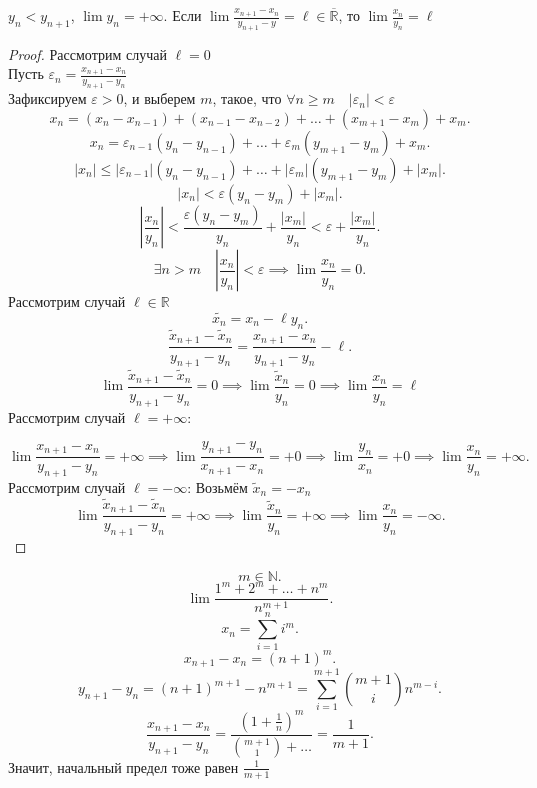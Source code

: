 \documentclass[11pt, oneside]{article}   	%
\begin{document}
    \begin{theorem}
        $y_n < y_{n+1}$, $\lim y_n = +\infty$. Если $\lim \frac{x_{n+1}-x_n}{y_{n+1}-y} = \ell\in \overline{\mathbb{R}}$, то $\lim \frac{x_n}{y_n} = \ell$ 
        \begin{proof}
            Рассмотрим случай $\ell = 0$\\
            Пусть $\varepsilon_n = \frac{x_{n+1}-x_n}{y_{n+1}-y_n}$ \\
            Зафиксируем $\varepsilon > 0$, и выберем  $m$, такое, что  $\forall{n\ge m}\quad |\varepsilon_n| < \varepsilon$\\
            \[ x_n = (x_n-x_{n-1})+(x_{n-1}-x_{n-2}) + \ldots + (x_{m+1} - x_m) + x_m .\]
            \[ x_n = \varepsilon_{n-1}(y_n-y_{n-1})+\ldots+\varepsilon_m(y_{m+1}-y_m)+x_m .\]
            \[ \left|x_n\right| \le |\varepsilon_{n-1}|(y_n-y_{n-1}) + \ldots + |\varepsilon_m|(y_{m+1}-y_m)+\left|x_m\right| .\]
            \[ \left|x_n\right| < \varepsilon\left( y_n - y_m \right) + \left|x_m\right|  .\]
            \[ \left|\frac{x_n}{y_n}\right| < \frac{\varepsilon(y_n-y_m)}{y_n} + \frac{\left|x_m\right|}{y_n} < \varepsilon + \frac{|x_m|}{y_n} .\]
            \[ \exists{n > m}\quad \left|\frac{x_n}{y_n}\right| < \varepsilon \implies \lim \frac{x_n}{y_n} = 0 .\]
            Рассмотрим случай $\ell\in \mathbb{R}$ \\
            \[ \tilde{x_n} = x_n-\ell y_n .\]
            \[ \frac{\tilde{x}_{n+1}-\tilde{x}_n}{y_{n+1}-y_n} = \frac{x_{n+1}-x_n}{y_{n+1}-y_n} - \ell .\]
            \[ \lim \frac{\tilde{x}_{n+1}-\tilde{x}_n}{y_{n+1}-y_n} = 0 \implies \lim \frac{\tilde{x}_n}{y_n} = 0 \implies \lim \frac{x_n}{y_n} = \ell \]
            Рассмотрим случай $\ell = +\infty$:

            \[ \lim \frac{x_{n+1}-x_n}{y_{n+1}-y_n} = +\infty \implies \lim \frac{y_{n+1}-y_n}{x_{n+1}-x_n} = +0 \implies \lim \frac{y_n}{x_n} = +0 \implies \lim \frac{x_n}{y_n} = +\infty.\]
            Рассмотрим случай $\ell = -\infty$:
            Возьмём $\tilde{x}_n = -x_n$\\
            \[ \lim \frac{\tilde{x}_{n+1}-\tilde{x}_n}{y_{n+1}-y_n} = +\infty \implies \lim \frac{\tilde{x}_n}{y_n} = +\infty \implies \lim \frac{x_n}{y_n} = -\infty .\] 
        \end{proof}
        \begin{example}
            \[ m\in \mathbb{N} .\]
            \[ \lim \frac{1^{m}+2^{m}+\ldots+n^{m}}{n^{m+1}} .\] 
            \[ x_n = \sum\limits_{i=1}^{n} i^{m} .\]
            \[ x_{n+1}-x_{n} = (n+1)^{m} .\]
            \[ y_{n+1}-y_{n} = (n+1)^{m+1}-n^{m+1} = \sum\limits_{i=1}^{m+1} \binom{m+1}{i}n^{m-i} .\]
            \[ \frac{x_{n+1}-x_n}{y_{n+1}-y_n} = \frac{\left(1+\frac{1}{n}\right)^{m}}{\binom{m+1}{1} + \ldots} = \frac{1}{m+1} .\]
            Значит, начальный предел тоже равен $\frac{1}{m+1}$
               
        \end{example}
    \end{theorem}
\end{document}
